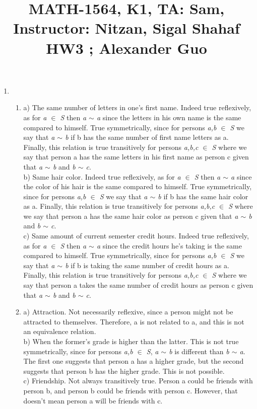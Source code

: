 \documentclass{article}
\title{\large{\vspace{-1.0cm}MATH-1564, K1, TA: Sam, Instructor: Nitzan, Sigal Shahaf \\ HW3 ; Alexander Guo}}
\date{ }
\begin{document}
\maketitle

\vspace{-1.5cm}
\large
\begin{enumerate}

	\item

	\begin{enumerate}[label=(\roman*)]

	\item 

a) The same number of letters in one's first name. Indeed true reflexively, as for \textit{a $\in$ S} then \textit{a $\sim$ a} since the letters in his own name is the same compared to himself. True symmetrically, since for persons \textit{a,b $\in$ S} we say that \textit{a $\sim$ b} if b has the same number of first name letters as a. Finally, this relation is true transitively for persons \textit{a,b,c $\in$ S} where we say that person a has the same letters in his first name as person c given that \textit{a $\sim$ b} and \textit{b $\sim$ c}. \\
b) Same hair color. Indeed true reflexively, as for \textit{a $\in$ S} then \textit{a $\sim$ a} since the color of his hair is the same compared to himself. True symmetrically, since for persons \textit{a,b $\in$ S} we say that \textit{a $\sim$ b} if b has the same hair color as a. Finally, this relation is true transitively for persons \textit{a,b,c $\in$ S} where we say that person a has the same hair color as person c given that \textit{a $\sim$ b} and \textit{b $\sim$ c}. \\
c) Same amount of current semester credit hours. Indeed true reflexively, as for \textit{a $\in$ S} then \textit{a $\sim$ a} since the credit hours he's taking is the same compared to himself. True symmetrically, since for persons \textit{a,b $\in$ S} we say that \textit{a $\sim$ b} if b is taking the same number of credit hours as a. Finally, this relation is true transitively for persons \textit{a,b,c $\in$ S} where we say that person a takes the same number of credit hours as person c given that \textit{a $\sim$ b} and \textit{b $\sim$ c}.
	 
	\item

a) Attraction. Not necessarily reflexive, since a person might not be attracted to themselves. Therefore, a is not related to a, and this is not an equivalence relation. \\
b) When the former's grade is higher than the latter. This is not true symmetrically, since for persons \textit{a,b $\in$ S}, \textit{a $\sim$ b} is different than \textit{b $\sim$ a}. The first one suggests that person a has a higher grade, but the second suggests that person b has the higher grade. This is not possible.\\
c) Friendship. Not always transitively true. Person a could be friends with person b, and person b could be friends with person c. However, that doesn't mean person a will be friends with c.
	

\end{enumerate}
\end{enumerate}
\end{document}
